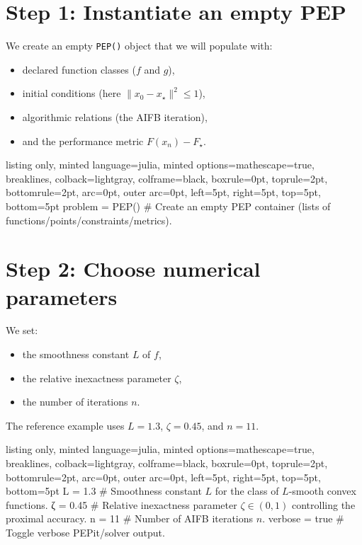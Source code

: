 \documentclass{article}
\begin{document}
\section{Step 1: Instantiate an empty PEP}

We create an empty \texttt{PEP()} object that we will populate with:

\begin{itemize}
\item declared function classes ($f$ and $g$),
\item initial conditions (here $\|x_0-x_\star\|^2 \le 1$),
\item algorithmic relations (the AIFB iteration),
\item and the performance metric $F(x_n)-F_\star$.
\end{itemize}

\begin{tcblisting}{listing only, minted language=julia, minted options={mathescape=true, breaklines}, colback=lightgray, colframe=black, boxrule=0pt, toprule=2pt, bottomrule=2pt, arc=0pt, outer arc=0pt, left=5pt, right=5pt, top=5pt, bottom=5pt}
problem = PEP() # Create an empty PEP container (lists of functions/points/constraints/metrics).
\end{tcblisting}


\section{Step 2: Choose numerical parameters}

We set:

\begin{itemize}
\item the smoothness constant $L$ of $f$,
\item the relative inexactness parameter $\zeta$,
\item the number of iterations $n$.
\end{itemize}

The reference example uses $L=1.3$, $\zeta=0.45$, and $n=11$.

\begin{tcblisting}{listing only, minted language=julia, minted options={mathescape=true, breaklines}, colback=lightgray, colframe=black, boxrule=0pt, toprule=2pt, bottomrule=2pt, arc=0pt, outer arc=0pt, left=5pt, right=5pt, top=5pt, bottom=5pt}
L = 1.3 # Smoothness constant $L$ for the class of $L$-smooth convex functions.
ζ = 0.45 # Relative inexactness parameter $\zeta \in (0,1)$ controlling the proximal accuracy.
n = 11 # Number of AIFB iterations $n$.
verbose = true # Toggle verbose PEPit/solver output.
\end{tcblisting}
\end{document}
